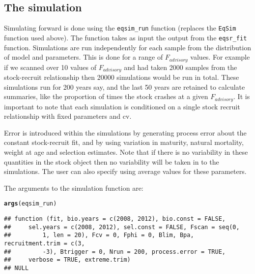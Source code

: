 \documentclass[a4paper]{article}\usepackage{graphicx, color}
\makeatletter
\newcommand{\hlfunctioncall}[1]{\textcolor[rgb]{0.501960784313725,0,0.329411764705882}{\textbf{#1}}}%
\newenvironment{kframe}{%
 \def\at@end@of@kframe{}%
 \ifinner\ifhmode%
  \def\at@end@of@kframe{\end{minipage}}%
  \begin{minipage}{\columnwidth}%
 \fi\fi%
 \def\FrameCommand##1{\hskip\@totalleftmargin \hskip-\fboxsep
 \colorbox{shadecolor}{##1}\hskip-\fboxsep
     \hskip-\linewidth \hskip-\@totalleftmargin \hskip\columnwidth}%
 \MakeFramed {\advance\hsize-\width
   \@totalleftmargin\z@ \linewidth\hsize
   \@setminipage}}%
 {\par\unskip\endMakeFramed%
 \at@end@of@kframe}
\newenvironment{knitrout}{}{} %
\makeatother
\begin{document}
\subsection{The simulation}
Simulating forward is done using the \texttt{eqsim\_run} function (replaces the \texttt{EqSim} function used above).  The function takes as input the output from the \texttt{eqsr\_fit} function. Simulations are run independently for each sample from the distribution of model and parameters.  This is done for a range of $F_{advisory}$ values. For example if we scanned over 10 values of $F_{advisory}$ and had taken 2000 samples from the stock-recruit relationship then 20000 simulations would be run in total.  These simulations run for 200 years say, and the last 50 years are retained to calculate summaries, like the proportion of times the stock crashes at a given $F_{advisory}$.  It is important to note that each simulation is conditioned on a single stock recruit relationship with fixed parameters and cv.

Error is introduced within the simulations by generating process error about the constant stock-recruit fit, and by using variation in maturity, natural mortality, weight at age and selection estimates.  Note that if there is no variability in these quantities in the stock object then no variability will be taken in to the simulations. The user can also specify using average values for these parameters.

The arguments to the simulation function are:
\begin{knitrout}
\color{fgcolor}\begin{kframe}
\begin{alltt}
\hlfunctioncall{args}(eqsim_run)
\end{alltt}
\begin{verbatim}
## function (fit, bio.years = c(2008, 2012), bio.const = FALSE, 
##     sel.years = c(2008, 2012), sel.const = FALSE, Fscan = seq(0, 
##         1, len = 20), Fcv = 0, Fphi = 0, Blim, Bpa, recruitment.trim = c(3, 
##         -3), Btrigger = 0, Nrun = 200, process.error = TRUE, 
##     verbose = TRUE, extreme.trim) 
## NULL
\end{verbatim}
\end{kframe}
\end{knitrout}
\end{document}
